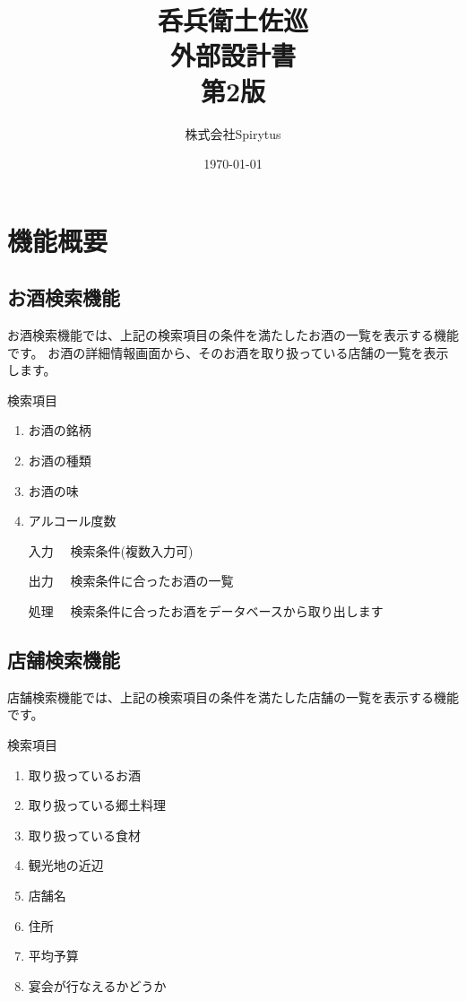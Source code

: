 \documentclass[a4j,titlepage]{jarticle}
\title{呑兵衛土佐巡\\
外部設計書\\
第2版}
\author{株式会社Spirytus}
\date{\today}
\begin{document}
\maketitle
\tableofcontents

\clearpage

\section{機能概要}
\subsection{お酒検索機能}
お酒検索機能では、上記の検索項目の条件を満たしたお酒の一覧を表示する機能です。
お酒の詳細情報画面から、そのお酒を取り扱っている店舗の一覧を表示します。

検索項目
\begin{enumerate}
\item お酒の銘柄
\item お酒の種類
\item お酒の味
\item アルコール度数
\end{enumerate}

\begin{enumerate}
\item [入力]　検索条件(複数入力可)
\item [出力]　検索条件に合ったお酒の一覧
\item [処理]　検索条件に合ったお酒をデータベースから取り出します
\end{enumerate}

\subsection{店舗検索機能}
店舗検索機能では、上記の検索項目の条件を満たした店舗の一覧を表示する機能です。

検索項目
\begin{enumerate}
\item 取り扱っているお酒
\item 取り扱っている郷土料理
\item 取り扱っている食材
\item 観光地の近辺
\item 店舗名
\item 住所
\item 平均予算
\item 宴会が行なえるかどうか
\end{enumerate}
\end{document}
